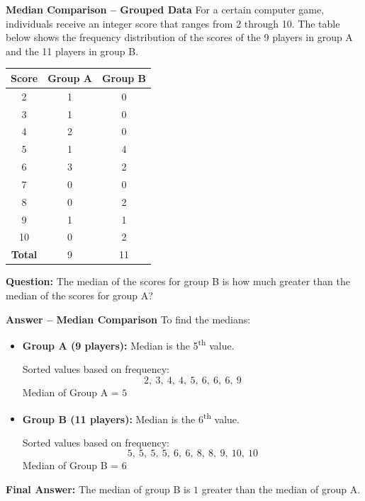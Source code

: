 \documentclass{beamer}
\begin{document}
\begin{frame}{\textbf{Median Comparison – Grouped Data}}
\small
For a certain computer game, individuals receive an integer score that ranges from 2 through 10. The table below shows the frequency distribution of the scores of the 9 players in group A and the 11 players in group B.

\begin{center}
\begin{tabular}{|c|c|c|}
\hline
\textbf{Score} & \textbf{Group A} & \textbf{Group B} \\
\hline
2 & 1 & 0 \\
3 & 1 & 0 \\
4 & 2 & 0 \\
5 & 1 & 4 \\
6 & 3 & 2 \\
7 & 0 & 0 \\
8 & 0 & 2 \\
9 & 1 & 1 \\
10 & 0 & 2 \\
\hline
\textbf{Total} & 9 & 11 \\
\hline
\end{tabular}
\end{center}

\vspace{2mm}
\textbf{Question:} The median of the scores for group B is how much greater than the median of the scores for group A?
\end{frame}


\begin{frame}{\textbf{Answer – Median Comparison}}
To find the medians:

\begin{itemize}
    \item \textbf{Group A (9 players):} Median is the 5\textsuperscript{th} value.
    
    Sorted values based on frequency:
    \[
    2,\ 3,\ 4,\ 4,\ \boxed{5},\ 6,\ 6,\ 6,\ 9
    \]
    Median of Group A = \( \boxed{5} \)
    
    \item \textbf{Group B (11 players):} Median is the 6\textsuperscript{th} value.
    
    Sorted values based on frequency:
    \[
    5,\ 5,\ 5,\ 5,\ 6,\ \boxed{6},\ 8,\ 8,\ 9,\ 10,\ 10
    \]
    Median of Group B = \( \boxed{6} \)
\end{itemize}

\textbf{Final Answer:} The median of group B is \( \boxed{1} \) greater than the median of group A.
\end{frame}
\end{document}

